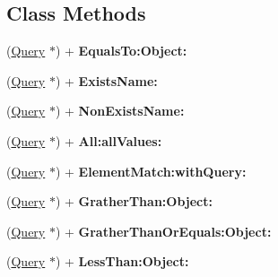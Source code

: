 \subsection*{Class Methods}
\begin{DoxyCompactItemize}
\item 
\hypertarget{interface_query_a851a2756d7f264454b084b28718ae3f6}{(\hyperlink{interface_query}{Query} $\ast$) + {\bfseries Equals\-To\-:\-Object\-:}}\label{interface_query_a851a2756d7f264454b084b28718ae3f6}

\item 
\hypertarget{interface_query_a5fcf9a2b206adf4c36dbbdfc6e9bd5ef}{(\hyperlink{interface_query}{Query} $\ast$) + {\bfseries Exists\-Name\-:}}\label{interface_query_a5fcf9a2b206adf4c36dbbdfc6e9bd5ef}

\item 
\hypertarget{interface_query_af93e6708319cab329421b83e22bba361}{(\hyperlink{interface_query}{Query} $\ast$) + {\bfseries Non\-Exists\-Name\-:}}\label{interface_query_af93e6708319cab329421b83e22bba361}

\item 
\hypertarget{interface_query_adfb5588eb5195b040250df257f3e638d}{(\hyperlink{interface_query}{Query} $\ast$) + {\bfseries All\-:all\-Values\-:}}\label{interface_query_adfb5588eb5195b040250df257f3e638d}

\item 
\hypertarget{interface_query_a1b0dcbd2e6e640c39b467dde6a8169ca}{(\hyperlink{interface_query}{Query} $\ast$) + {\bfseries Element\-Match\-:with\-Query\-:}}\label{interface_query_a1b0dcbd2e6e640c39b467dde6a8169ca}

\item 
\hypertarget{interface_query_ada364a1c4397c7428be2ec94334d64b7}{(\hyperlink{interface_query}{Query} $\ast$) + {\bfseries Grather\-Than\-:\-Object\-:}}\label{interface_query_ada364a1c4397c7428be2ec94334d64b7}

\item 
\hypertarget{interface_query_a7fc14883e6907a9c5556d5ee3bdd92ce}{(\hyperlink{interface_query}{Query} $\ast$) + {\bfseries Grather\-Than\-Or\-Equals\-:\-Object\-:}}\label{interface_query_a7fc14883e6907a9c5556d5ee3bdd92ce}

\item 
\hypertarget{interface_query_a1a220d8eb332c46a5deaec5e4da5379f}{(\hyperlink{interface_query}{Query} $\ast$) + {\bfseries Less\-Than\-:\-Object\-:}}\label{interface_query_a1a220d8eb332c46a5deaec5e4da5379f}


\end{DoxyCompactItemize}
